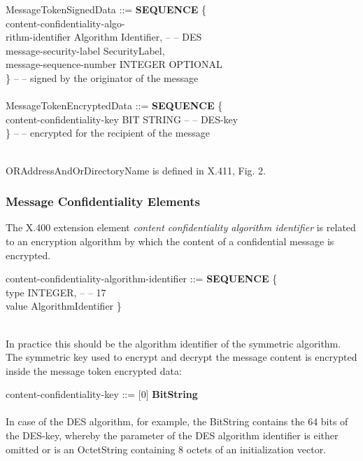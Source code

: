{\small
\btab
\1 MessageTokenSignedData ::= {\bf SEQUENCE} \{ \\
\2 content-confidentiality-algo- \\
\2 rithm-identifier        \3 [0] Algorithm Identifier, -- -- DES \\
\2 message-security-label  \3 [2] SecurityLabel, \\
\2 message-sequence-number \3 [4] INTEGER OPTIONAL \\
\2 \} -- -- signed by the originator of the message \\
\\
\1 MessageTokenEncryptedData ::= {\bf SEQUENCE} \{ \\
\2 content-confidentiality-key  \3 [0] BIT STRING -- -- DES-key \\
\2 \} -- -- encrypted for the recipient of the message \\
\\
\etab
}

ORAddressAndOrDirectoryName is defined in X.411, Fig. 2.

\subsubsection{Message Confidentiality Elements}
\label{asn1-conf}

The X.400 extension element
{\em content confidentiality algorithm identifier}
is related to an encryption algorithm
by which the content of a confidential message is encrypted.

{\small
\btab
\1 content-confidentiality-algorithm-identifier ::= {\bf SEQUENCE} \{ \\
\2         type  \3 [0] INTEGER, -- -- 17 \\
\2         value \3 [2] AlgorithmIdentifier \} \\
\\
\etab
}

In practice this should be the algorithm identifier of
the symmetric algorithm.
The symmetric key used to encrypt and decrypt the message content
is encrypted inside the message token encrypted data:

{\small
\btab
\1 content-confidentiality-key ::= [0] {\bf BitString} \\
\\
\etab
}
In case of the DES algorithm, for example, the BitString contains the 64 bits of the DES-key,
whereby the parameter of the DES algorithm identifier
is either omitted or is an OctetString containing 8 octets
of an initialization vector.

